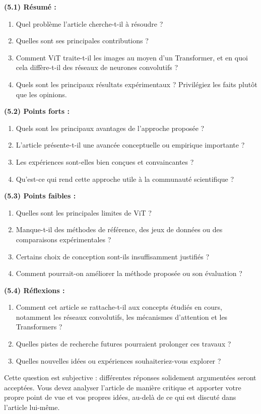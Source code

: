 \documentclass[12pt]{article}
\theoremstyle{definition}
\begin{document}
\textbf{(5.1) Résumé :}
\begin{enumerate}[label=(\alph*),leftmargin=25pt,itemsep=2pt,topsep=2pt]
\item Quel problème l'article cherche-t-il à résoudre ?
\item Quelles sont ses principales contributions ?
\item Comment ViT traite-t-il les images au moyen d'un Transformer, et en quoi cela diffère-t-il des réseaux de neurones convolutifs ?
\item Quels sont les principaux résultats expérimentaux ? Privilégiez les faits plutôt que les opinions.
\end{enumerate}
\textbf{(5.2) Points forts :}
\begin{enumerate}[label=(\alph*),leftmargin=25pt,itemsep=2pt,topsep=2pt]
\item Quels sont les principaux avantages de l'approche proposée ?
\item L'article présente-t-il une avancée conceptuelle ou empirique importante ?
\item Les expériences sont-elles bien conçues et convaincantes ?
\item Qu'est-ce qui rend cette approche utile à la communauté scientifique ?
\end{enumerate}
\textbf{(5.3) Points faibles :}
\begin{enumerate}[label=(\alph*),leftmargin=25pt,itemsep=2pt,topsep=2pt]
\item Quelles sont les principales limites de ViT ?
\item Manque-t-il des méthodes de référence, des jeux de données ou des comparaisons expérimentales ?
\item Certains choix de conception sont-ils insuffisamment justifiés ?
\item Comment pourrait-on améliorer la méthode proposée ou son évaluation ?
\end{enumerate}
\textbf{(5.4) Réflexions :}
\begin{enumerate}[label=(\alph*),leftmargin=25pt,itemsep=2pt,topsep=2pt]
\item Comment cet article se rattache-t-il aux concepts étudiés en cours, notamment les réseaux convolutifs, les mécanismes d'attention et les Transformers ?
\item Quelles pistes de recherche futures pourraient prolonger ces travaux ?
\item Quelles nouvelles idées ou expériences souhaiteriez-vous explorer ?
\end{enumerate}
Cette question est subjective : différentes réponses solidement argumentées seront acceptées. Vous devez analyser l'article de manière critique et apporter votre propre point de vue et vos propres idées, au-delà de ce qui est discuté dans l'article lui-même.
\end{document}
